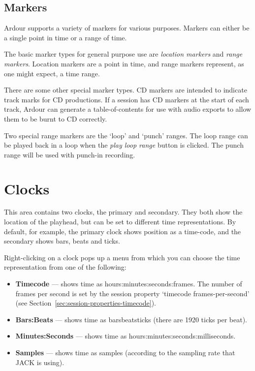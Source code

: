 \documentclass[10pt,a4paper]{book}
\begin{document}
{\subsection{Markers}

Ardour supports a variety of markers for various purposes.  Markers
can either be a single point in time or a range of time.

The basic marker types for general purpose use are \emph{location
  markers} and \emph{range markers}.  Location markers are a point in
time, and range markers represent, as one might expect, a time range.  

There are some other special marker types.  CD markers are intended to
indicate track marks for CD productions.  If a session has CD markers
at the start of each track, Ardour can generate a table-of-contents
for use with audio exports to allow them to be burnt to CD correctly.

Two special range markers are the `loop' and `punch' ranges.  The loop
range can be played back in a loop when the \emph{play loop range}
button is clicked.  The punch range will be used with punch-in
recording.


\section{Clocks}

This area contains two clocks, the primary and secondary.  They both
show the location of the playhead, but can be set to different time
representations.  By default, for example, the primary clock shows
position as a time-code, and the secondary shows bars, beats and
ticks.

Right-clicking on a clock pops up a menu from which you can choose the
time representation from one of the following:

\begin{itemize}
\item \textbf{Timecode} --- shows time as
  hours:minutes:seconds:frames.  The number of frames per second is
  set by the session property `timecode frames-per-second' (see
  Section~\ref{sec:session-properties-timecode}).
\item \textbf{Bars:Beats} --- shows time as
  bars\textbar{}beats\textbar{}ticks (there are 1920 ticks per beat).
\item \textbf{Minutes:Seconds} --- shows time as
  hours:minutes:seconds:milliseconds.
\item \textbf{Samples} --- shows time as samples (according to the
  sampling rate that JACK is using).
\end{itemize}

}
\end{document}
